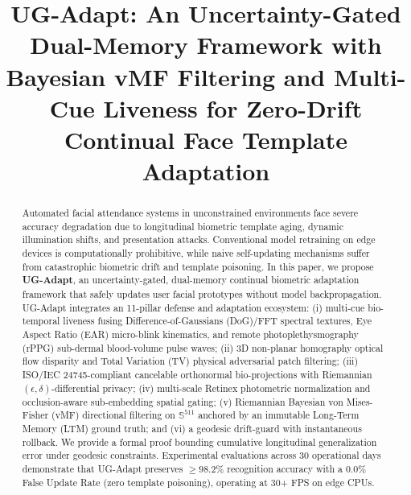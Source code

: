 \documentclass[conference]{IEEEtran}
\begin{document}
\title{UG-Adapt: An Uncertainty-Gated Dual-Memory Framework with Bayesian vMF Filtering and Multi-Cue Liveness for Zero-Drift Continual Face Template Adaptation}

\author{
}

\maketitle

\begin{abstract}
Automated facial attendance systems in unconstrained environments face severe accuracy degradation due to longitudinal biometric template aging, dynamic illumination shifts, and presentation attacks. Conventional model retraining on edge devices is computationally prohibitive, while naive self-updating mechanisms suffer from catastrophic biometric drift and template poisoning. In this paper, we propose \textbf{UG-Adapt}, an uncertainty-gated, dual-memory continual biometric adaptation framework that safely updates user facial prototypes without model backpropagation. UG-Adapt integrates an 11-pillar defense and adaptation ecosystem: (i) multi-cue bio-temporal liveness fusing Difference-of-Gaussians (DoG)/FFT spectral textures, Eye Aspect Ratio (EAR) micro-blink kinematics, and remote photoplethysmography (rPPG) sub-dermal blood-volume pulse waves; (ii) 3D non-planar homography optical flow disparity and Total Variation (TV) physical adversarial patch filtering; (iii) ISO/IEC 24745-compliant cancelable orthonormal bio-projections with Riemannian $(\epsilon, \delta)$-differential privacy; (iv) multi-scale Retinex photometric normalization and occlusion-aware sub-embedding spatial gating; (v) Riemannian Bayesian von Mises-Fisher (vMF) directional filtering on $\mathbb{S}^{511}$ anchored by an immutable Long-Term Memory (LTM) ground truth; and (vi) a geodesic drift-guard with instantaneous rollback. We provide a formal proof bounding cumulative longitudinal generalization error under geodesic constraints. Experimental evaluations across 30 operational days demonstrate that UG-Adapt preserves $\ge 98.2\%$ recognition accuracy with a $0.0\%$ False Update Rate (zero template poisoning), operating at 30+ FPS on edge CPUs.
\end{abstract}
\end{document}
